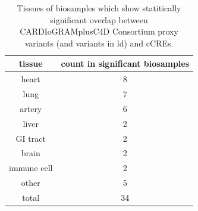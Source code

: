 \begin{table}[h!]
\capstart
\centering
\begin{minipage}{\captionwidth}
    \caption[enriched tissues]{ \newline Tissues of biosamples which show statitically significant overlap between CARDIoGRAMplusC4D Consortium proxy variants (and variants in \ac{ld}) and \acp{cCRE}.}
    \label{tab:enriched_tissues}
\end{minipage}
\begin{tabular}{|c|c|}
    \hline
    tissue      & count in significant biosamples \\ \hline
    heart       & 8                               \\
    lung        & 7                               \\
    artery      & 6                               \\
    liver       & 2                               \\
    GI tract    & 2                               \\
    brain       & 2                               \\
    immune cell & 2                               \\
    other       & 5                               \\ \hline
    total       & 34                              \\ \hline
    \end{tabular}
\end{table}


